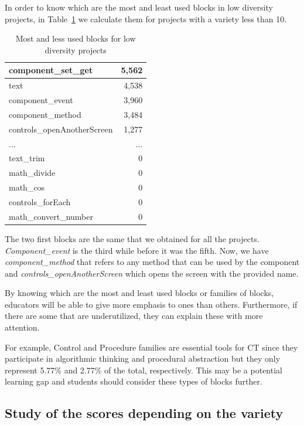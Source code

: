 \documentclass[a4paper]{article}
\begin{document}
In order to know which are the most and least used blocks in low diversity projects, in Table~\ref{tab:most-least-low} we calculate them for projects with a variety less than 10.

\begin{table}[ht]
\begin{center}
\caption{Most and less used blocks for low diversity projects}
\bigskip
\label{tab:most-least-low}
\begin{tabular}{|l|r|}
\hline
component\_set\_get & 5,562\\ \hline
text & 4,538\\ \hline
component\_event & 3,960\\ \hline
component\_method & 3,484\\ \hline
controls\_openAnotherScreen & 1,277\\ \hline
... & ... \\ \hline
text\_trim & 0\\ \hline
math\_divide & 0\\ \hline
math\_cos & 0\\ \hline
controls\_forEach & 0\\ \hline
math\_convert\_number & 0\\ \hline
\end{tabular}
\end{center}
\end{table}

The two first blocks are the same that we obtained for all the projects. \emph{Component\_event} is the third while before it was the fifth. Now, we have \emph{component\_method} that refers to any method that can be used by the component and \emph{controls\_openAnotherScreen} which opens the screen with the provided name.

By knowing which are the most and least used blocks or families of blocks, educators will be able to give more emphasis to ones than others. Furthermore, if there are some that are underutilized, they can explain these with more attention.

For example, Control and Procedure families are essential tools for CT since they participate in algorithmic thinking and procedural abstraction but they only represent 5.77\% and 2.77\% of the total, respectively. This may be a potential learning gap and students should consider these types of blocks further.

\subsection{Study of the scores depending on the variety}
\end{document}
